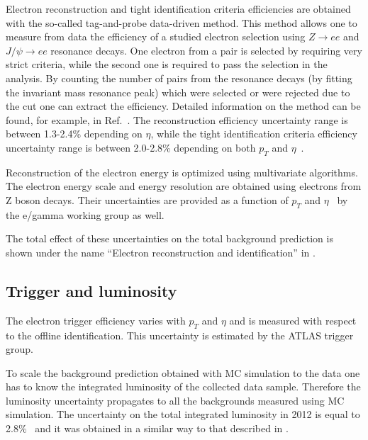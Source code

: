 Electron reconstruction and tight identification criteria efficiencies are obtained with the so-called tag-and-probe data-driven method.
This method allows one to measure from data the efficiency of a studied electron selection using $Z \to e e$ and $J/\psi \to e e$ resonance decays. 
One electron from a pair is selected by requiring very strict criteria, 
while the second one is required to pass the selection in the analysis.
By counting the number of pairs from the resonance decays (by fitting the invariant mass resonance peak) which were selected or 
were rejected due to the cut one can extract the efficiency. 
Detailed information on the method can be found, for example, in Ref.~\cite{tag-and-probe}.
The reconstruction efficiency uncertainty range is between 1.3-2.4\% depending on $\eta$, while the 
tight identification criteria efficiency uncertainty range is between 2.0-2.8\% depending on both $p_T$ and $\eta$~\cite{electron_reco_id_2011}.

Reconstruction of the electron energy is optimized using multivariate algorithms.
The electron energy scale and energy resolution are obtained using electrons from Z boson decays.
Their uncertainties are provided as a function of $p_T$ and $\eta$~\cite{electron_energy_errors_Run1} 
by the e/gamma working group as well.

The total effect of these uncertainties on the total background prediction 
is shown under the name ``Electron reconstruction and identification'' in .

\subsection{Trigger and luminosity}
The electron trigger efficiency varies with $p_T$ and $\eta$ and is measured with respect to the offline identification. This uncertainty is estimated by the ATLAS trigger group.

To scale the background prediction obtained with MC simulation to the data 
one has to know the integrated luminosity of the collected data sample. 
Therefore the luminosity uncertainty propagates to all the backgrounds measured using MC simulation.
The uncertainty on the total integrated luminosity in 2012 is equal to 2.8$\%$~\cite{Aad:2013ucp} 
and it was obtained in a similar way to that described in .

